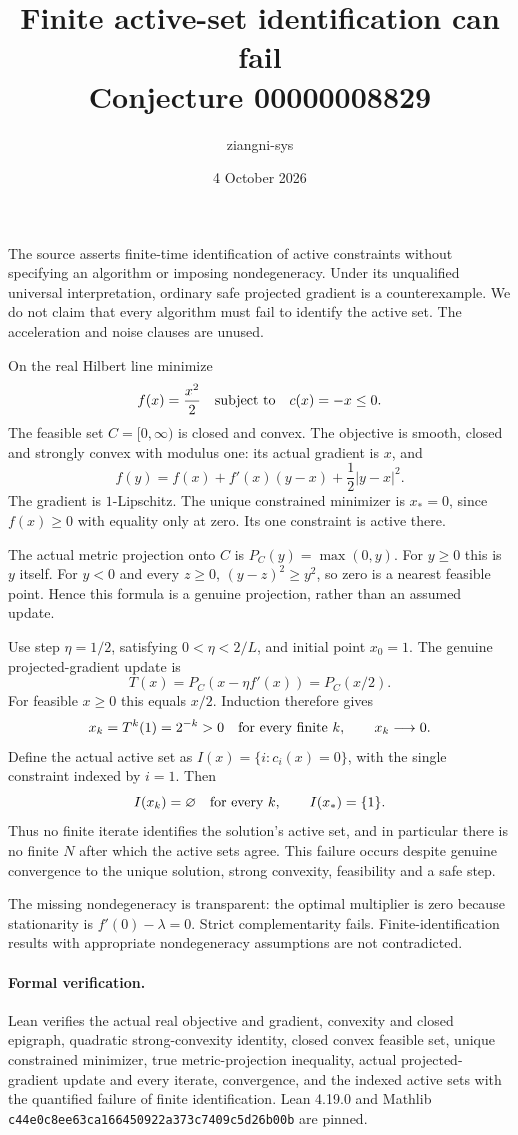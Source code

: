\documentclass[11pt]{article}
\title{Finite active-set identification can fail\\Conjecture 00000008829}
\author{ziangni-sys}
\date{4 October 2026}
\begin{document}
\maketitle
The source asserts finite-time identification of active constraints without specifying an algorithm or imposing nondegeneracy. Under its unqualified universal interpretation, ordinary safe projected gradient is a counterexample. We do not claim that every algorithm must fail to identify the active set. The acceleration and noise clauses are unused.

On the real Hilbert line minimize
\[
f(x)=\frac{x^2}{2}\quad\hbox{subject to}\quad c(x)=-x\le0.
\]
The feasible set $C=[0,\infty)$ is closed and convex. The objective is smooth, closed and strongly convex with modulus one: its actual gradient is $x$, and
\[
f(y)=f(x)+f'(x)(y-x)+\frac12|y-x|^2.
\]
The gradient is $1$-Lipschitz. The unique constrained minimizer is $x_*=0$, since $f(x)\ge0$ with equality only at zero. Its one constraint is active there.

The actual metric projection onto $C$ is $P_C(y)=\max(0,y)$. For $y\ge0$ this is $y$ itself. For $y<0$ and every $z\ge0$, $(y-z)^2\ge y^2$, so zero is a nearest feasible point. Hence this formula is a genuine projection, rather than an assumed update.

Use step $\eta=1/2$, satisfying $0<\eta<2/L$, and initial point $x_0=1$. The genuine projected-gradient update is
\[
T(x)=P_C(x-\eta f'(x))=P_C(x/2).
\]
For feasible $x\ge0$ this equals $x/2$. Induction therefore gives
\[
x_k=T^k(1)=2^{-k}>0\quad\hbox{for every finite }k,
\qquad x_k\longrightarrow0.
\]
Define the actual active set as $I(x)=\{i:c_i(x)=0\}$, with the single constraint indexed by $i=1$. Then
\[
I(x_k)=\varnothing\quad\hbox{for every }k,\qquad I(x_*)=\{1\}.
\]
Thus no finite iterate identifies the solution's active set, and in particular there is no finite $N$ after which the active sets agree. This failure occurs despite genuine convergence to the unique solution, strong convexity, feasibility and a safe step.

The missing nondegeneracy is transparent: the optimal multiplier is zero because stationarity is $f'(0)-\lambda=0$. Strict complementarity fails. Finite-identification results with appropriate nondegeneracy assumptions are not contradicted.

\paragraph{Formal verification.}
Lean verifies the actual real objective and gradient, convexity and closed epigraph, quadratic strong-convexity identity, closed convex feasible set, unique constrained minimizer, true metric-projection inequality, actual projected-gradient update and every iterate, convergence, and the indexed active sets with the quantified failure of finite identification. Lean 4.19.0 and Mathlib \texttt{c44e0c8ee63ca166450922a373c7409c5d26b00b} are pinned.
\end{document}
